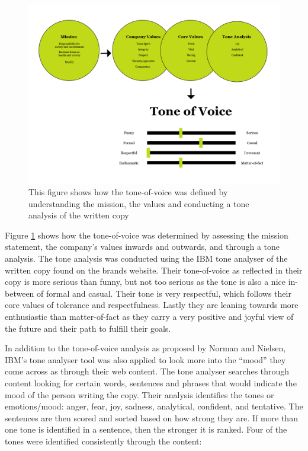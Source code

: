         \begin{figure}
            \centering
            \includegraphics[width=\textwidth]{figures/Tone-of-voice.png}
            \caption{This figure shows how the tone-of-voice was defined by understanding the mission, the values and conducting a tone analysis of the written copy}
            \label{fig:tov}
        \end{figure}
    
        Figure \ref{fig:tov} shows how the tone-of-voice was determined by assessing the mission statement, the company's values inwards and outwards, and through a tone analysis. The tone analysis was conducted using the IBM tone analyser of the written copy found on the brands website. Their tone-of-voice as reflected in their copy is more serious than funny, but not too serious as the tone is also a nice in-between of formal and casual. Their tone is very respectful, which follows their core values of tolerance and respectfulness. Lastly they are leaning towards more enthusiastic than matter-of-fact as they carry a very positive and joyful view of the future and their path to fulfill their goals.

        In addition to the tone-of-voice analysis as proposed by Norman and Nielsen, IBM’s tone analyser tool was also applied to look more into the “mood” they come across as through their web content. The tone analyser searches through content looking for certain words, sentences and phrases that would indicate the mood of the person writing the copy. Their analysis identifies the tones or emotions/mood: anger, fear, joy, sadness, analytical, confident, and tentative. The sentences are then scored and sorted based on how strong they are. If more than one tone is identified in a sentence, then the stronger it is ranked. Four of the tones were identified consistently through the content:
    
